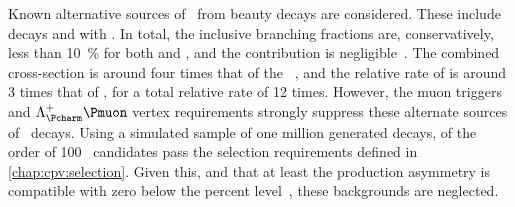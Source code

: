 Known alternative sources of \PLambdac\ from beauty decays are considered.
These include \decay{\PBplus}{\APLambdac\Pproton\Ppiplus} decays and
\decay{\PBplus}{\APSigmac\Pproton\Ppi\Ppi} with 
\decay{\PSigmac}{\PLambdac\Ppi}.
In total, the inclusive  branching fractions are, 
conservatively, less than \SI{10}{\percent} for both \PBplus and \PBzero, and 
the \PBs contribution is negligible~\cite{PDG2014}.
The combined \PB cross-section is around four times that of the 
\PLambdab~\cite{LHCb-PAPER-2013-004,Aaij:2015fea}, and the relative rate of 
 is around 3 times that of \LbToLcmuX, for a total 
relative rate of 12 times.
However, the muon triggers and $\PLambdac\Pmuon$ vertex requirements strongly 
suppress these alternate sources of \PLambdac\ decays.
Using a simulated sample of one million generated 
\decay{\PBzero}{\APLambdac\Pproton\Ppiminus\Ppiplus} decays, of the order of 
100 \PLambdac\ candidates pass the selection requirements defined in 
\cref{chap:cpv:selection}.
Given this, and that at least the \PBzero production asymmetry is compatible 
with zero below the percent level~\cite{Aaij:2014bba}, these backgrounds are 
neglected.
